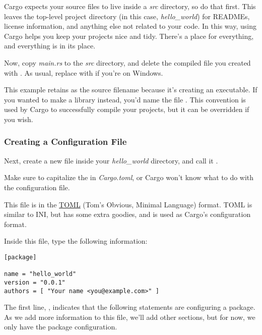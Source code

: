 Cargo expects your source files to live inside a \emph{src} directory, so do that first. This leaves the top-level 
project directory (in this case, \emph{hello\_world}) for READMEs, license information, and anything else not related 
to your code. In this way, using Cargo helps you keep your projects nice and tidy. There's a place for everything, 
and everything is in its place.

\blank

Now, copy \emph{main.rs} to the \emph{src} directory, and delete the compiled file you created with . As usual, 
replace  with  if you're on Windows.

\blank

This example retains  as the source filename because it's creating an executable. If you wanted to make a 
library instead, you'd name the file . This convention is used by Cargo to successfully compile your projects, 
but it can be overridden if you wish.

\subsubsection*{Creating a Configuration File}

Next, create a new file inside your \emph{hello\_world} directory, and call it .

\blank

Make sure to capitalize the  in \emph{Cargo.toml}, or Cargo won't know what to do with the configuration file.

\blank

This file is in the \href{https://github.com/toml-lang/toml}{TOML} (Tom's Obvious, Minimal Language) format. TOML is similar 
to INI, but has some extra goodies, and is used as Cargo's configuration format.

\blank

Inside this file, type the following information:

\begin{verbatim}
[package]

name = "hello_world"
version = "0.0.1"
authors = [ "Your name <you@example.com>" ] 
\end{verbatim}

The first line, \code{[package]}, indicates that the following statements are configuring a package. As we add more information 
to this file, we'll add other sections, but for now, we only have the package configuration.

